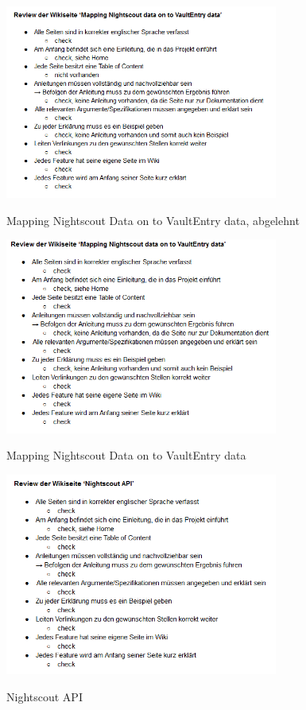 \documentclass[accentcolor=tud0b,12pt,paper=a4]{tudreport}
\begin{document}
\begin{figure}[h]
\centering
\caption{Mapping Nightscout Data on to VaultEntry data, abgelehnt}
\includegraphics[width=0.8\textwidth]{wiki11}
\label{wiki11}
\end{figure}

\begin{figure}[h]
\centering
\caption{Mapping Nightscout Data on to VaultEntry data}
\includegraphics[width=0.8\textwidth]{wiki12}
\label{wiki12}
\end{figure}

\begin{figure}[h]
\centering
\caption{Nightscout API}
\includegraphics[width=0.8\textwidth]{wiki13}
\label{wiki13}
\end{figure}
\end{document}
